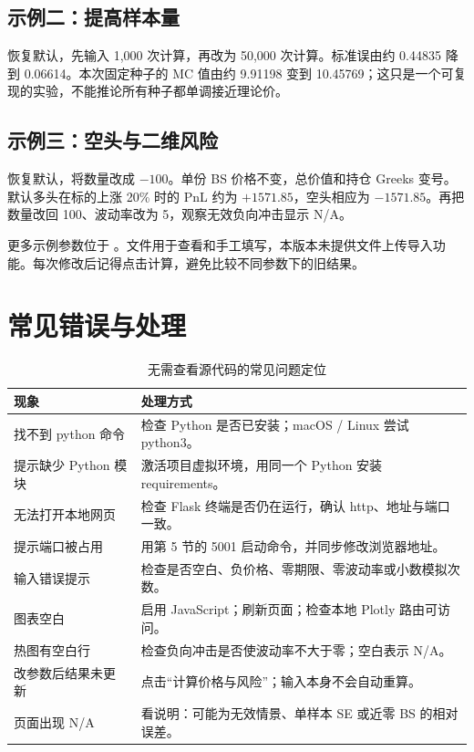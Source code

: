 \documentclass[UTF8,a4paper,12pt]{ctexart}
\begin{document}
\subsection*{示例二：提高样本量}
恢复默认，先输入 1,000 次计算，再改为 50,000 次计算。标准误由约 0.44835 降到 0.06614。本次固定种子的 MC 值由约 9.91198 变到 10.45769；这只是一个可复现的实验，不能推论所有种子都单调接近理论价。

\subsection*{示例三：空头与二维风险}
恢复默认，将数量改成 $-100$。单份 BS 价格不变，总价值和持仓 Greeks 变号。默认多头在标的上涨 20\% 时的 PnL 约为 $+1571.85$，空头相应为 $-1571.85$。再把数量改回 100、波动率改为 5，观察无效负向冲击显示 N/A。

更多示例参数位于 。文件用于查看和手工填写，本版本未提供文件上传导入功能。每次修改后记得点击计算，避免比较不同参数下的旧结果。
\newpage

\section{常见错误与处理}
\begin{table}[H]\centering\small
\begin{tabularx}{\linewidth}{p{4.1cm}X}\toprule 现象 & 处理方式\\\midrule
找不到 python 命令 & 检查 Python 是否已安装；macOS / Linux 尝试 python3。\\
提示缺少 Python 模块 & 激活项目虚拟环境，用同一个 Python 安装 requirements。\\
无法打开本地网页 & 检查 Flask 终端是否仍在运行，确认 http、地址与端口一致。\\
提示端口被占用 & 用第 5 节的 5001 启动命令，并同步修改浏览器地址。\\
输入错误提示 & 检查是否空白、负价格、零期限、零波动率或小数模拟次数。\\
图表空白 & 启用 JavaScript；刷新页面；检查本地 Plotly 路由可访问。\\
热图有空白行 & 检查负向冲击是否使波动率不大于零；空白表示 N/A。\\
改参数后结果未更新 & 点击“计算价格与风险”；输入本身不会自动重算。\\
页面出现 N/A & 看说明：可能为无效情景、单样本 SE 或近零 BS 的相对误差。\\\bottomrule
\end{tabularx}\caption{无需查看源代码的常见问题定位}
\end{table}
\end{document}

